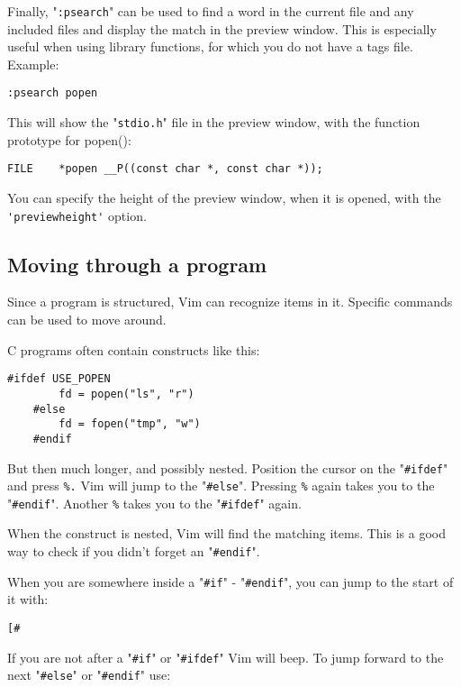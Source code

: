 Finally, "\verb!:psearch!" can be used to find a word in the current file and any included files and display the match in the preview window.
This is especially useful when using library functions, for which you do not have a tags file.
Example:

\begin{Verbatim}[samepage=true]
 :psearch popen
\end{Verbatim}

This will show the "\verb!stdio.h!" file in the preview window, with the function prototype for popen():

\begin{Verbatim}[samepage=true]
    FILE    *popen __P((const char *, const char *)); 
\end{Verbatim}

You can specify the height of the preview window, when it is opened, with the \verb!'previewheight'! option.
\subsection{Moving through a program}
Since a program is structured, Vim can recognize items in it.
Specific commands can be used to move around.

C programs often contain constructs like this:

\begin{Verbatim}[samepage=true]
    #ifdef USE_POPEN 
        fd = popen("ls", "r") 
    #else 
        fd = fopen("tmp", "w") 
    #endif 
\end{Verbatim}

But then much longer, and possibly nested.
Position the cursor on the "\verb!#ifdef!" and press \verb!%.!
Vim will jump to the "\verb!#else!".
Pressing \verb!%! again takes you to the "\verb!#endif!".
Another \verb!%! takes you to the "\verb!#ifdef!" again.

When the construct is nested, Vim will find the matching items.
This is a good way to check if you didn't forget an "\verb!#endif!".

When you are somewhere inside a "\verb!#if!" - "\verb!#endif!", you can jump to the start of it with:

\begin{Verbatim}[samepage=true]
 [#
\end{Verbatim}

If you are not after a "\verb!#if!" or "\verb!#ifdef!" Vim will beep.
To jump forward to the next "\verb!#else!" or "\verb!#endif!" use:

